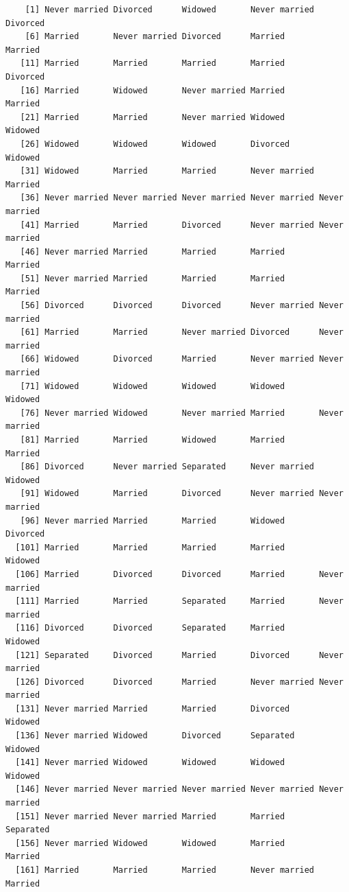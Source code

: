 \documentclass[
  letterpaper,
  DIV=11,
  numbers=noendperiod,
  oneside]{scrartcl}
\begin{document}
\begin{verbatim}
    [1] Never married Divorced      Widowed       Never married Divorced     
    [6] Married       Never married Divorced      Married       Married      
   [11] Married       Married       Married       Married       Divorced     
   [16] Married       Widowed       Never married Married       Married      
   [21] Married       Married       Never married Widowed       Widowed      
   [26] Widowed       Widowed       Widowed       Divorced      Widowed      
   [31] Widowed       Married       Married       Never married Married      
   [36] Never married Never married Never married Never married Never married
   [41] Married       Married       Divorced      Never married Never married
   [46] Never married Married       Married       Married       Married      
   [51] Never married Married       Married       Married       Married      
   [56] Divorced      Divorced      Divorced      Never married Never married
   [61] Married       Married       Never married Divorced      Never married
   [66] Widowed       Divorced      Married       Never married Never married
   [71] Widowed       Widowed       Widowed       Widowed       Widowed      
   [76] Never married Widowed       Never married Married       Never married
   [81] Married       Married       Widowed       Married       Married      
   [86] Divorced      Never married Separated     Never married Widowed      
   [91] Widowed       Married       Divorced      Never married Never married
   [96] Never married Married       Married       Widowed       Divorced     
  [101] Married       Married       Married       Married       Widowed      
  [106] Married       Divorced      Divorced      Married       Never married
  [111] Married       Married       Separated     Married       Never married
  [116] Divorced      Divorced      Separated     Married       Widowed      
  [121] Separated     Divorced      Married       Divorced      Never married
  [126] Divorced      Divorced      Married       Never married Never married
  [131] Never married Married       Married       Divorced      Widowed      
  [136] Never married Widowed       Divorced      Separated     Widowed      
  [141] Never married Widowed       Widowed       Widowed       Widowed      
  [146] Never married Never married Never married Never married Never married
  [151] Never married Never married Married       Married       Separated    
  [156] Never married Widowed       Widowed       Married       Married      
  [161] Married       Married       Married       Never married Married      

\end{verbatim}
\end{document}
